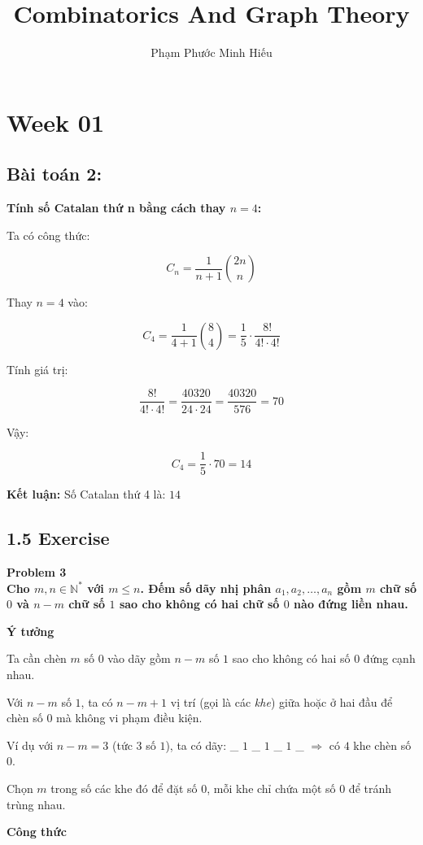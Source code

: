 \documentclass{article}
\title{Combinatorics And Graph Theory}
\author{Phạm Phước Minh Hiếu}
\begin{document}
	\maketitle
	\section*{Week 01}
	\subsection*{Bài toán 2:}
	\textbf{Tính số Catalan thứ n bằng cách thay $n = 4$:}
	
	Ta có công thức:
	
	\[
	C_n = \frac{1}{n+1} \binom{2n}{n}
	\]
	
	Thay $n = 4$ vào:
	
	\[
	C_4 = \frac{1}{4 + 1} \binom{8}{4}
	= \frac{1}{5} \cdot \frac{8!}{4! \cdot 4!}
	\]
	
	Tính giá trị:
	
	\[
	\frac{8!}{4! \cdot 4!} = \frac{40320}{24 \cdot 24} = \frac{40320}{576} = 70
	\]
	
	Vậy:
	
	\[
	C_4 = \frac{1}{5} \cdot 70 = 14
	\]
	
	\textbf{Kết luận:} Số Catalan thứ 4 là: $14$
	
	
	
	\subsection*{1.5 Exercise}
	\textbf{Problem 3}\\
	\textbf{Cho $m, n \in \mathbb{N}^*$ với $m \leq n$. Đếm số dãy nhị phân $a_1, a_2, \ldots, a_n$ gồm $m$ chữ số $0$ và $n - m$ chữ số $1$ sao cho không có hai chữ số $0$ nào đứng liền nhau.}
	
	\textbf{Ý tưởng}
	
	Ta cần chèn $m$ số $0$ vào dãy gồm $n - m$ số $1$ sao cho không có hai số $0$ đứng cạnh nhau. 
	
	Với $n - m$ số $1$, ta có $n - m + 1$ vị trí (gọi là các \textit{khe}) giữa hoặc ở hai đầu để chèn số $0$ mà không vi phạm điều kiện.
	
	Ví dụ với $n - m = 3$ (tức 3 số $1$), ta có dãy: \_ $1$ \_ $1$ \_ $1$ \_  $\Rightarrow$ có $4$ khe chèn số $0$.
	
	Chọn $m$ trong số các khe đó để đặt số $0$, mỗi khe chỉ chứa một số $0$ để tránh trùng nhau.
	
	\textbf{Công thức}
	
\end{document}
